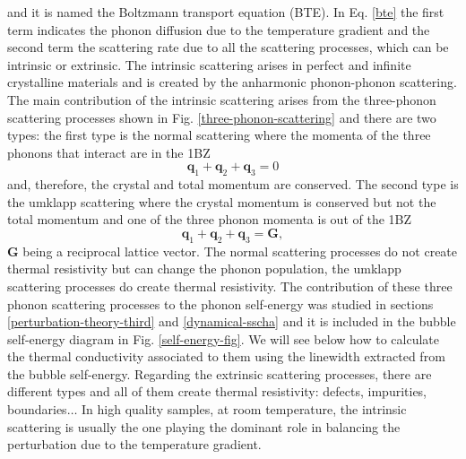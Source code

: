 and it is named the Boltzmann transport equation (BTE). In Eq. \ref{bte} the first term indicates the phonon diffusion due to the temperature gradient and the second term the scattering rate due to all the scattering 
processes, which can be intrinsic or extrinsic. The intrinsic scattering arises in perfect and infinite crystalline materials and is created by the anharmonic phonon-phonon scattering. The main contribution of 
the intrinsic scattering arises from the three-phonon scattering processes shown in Fig. \ref{three-phonon-scattering} and there are two types: the first type is the normal scattering where the momenta of the three 
phonons that interact are in the 1BZ
\begin{equation}
\mathbf{q}_{1}+\mathbf{q}_{2}+\mathbf{q}_{3}=0
\end{equation} 
and, therefore, the crystal and total momentum are conserved. The second type is the umklapp scattering where the crystal momentum is conserved but not the total momentum and one of the three phonon momenta is out of the 1BZ
\begin{equation}
\mathbf{q}_{1}+\mathbf{q}_{2}+\mathbf{q}_{3}=\mathbf{G},
\end{equation}
$\mathbf{G}$ being a reciprocal lattice vector. The normal scattering processes do not create thermal resistivity but can change the phonon population\cite{callaway1959model,tritt2005thermal}, the umklapp scattering 
processes do create thermal resistivity. The contribution of these three phonon scattering processes to the phonon self-energy was studied in sections \ref{perturbation-theory-third} and \ref{dynamical-sscha} and it is 
included in the bubble self-energy diagram in Fig. \ref{self-energy-fig}. We will see below how to calculate the thermal conductivity associated to them using the linewidth extracted from the bubble self-energy. Regarding the 
extrinsic scattering processes, there are different types and all of them create thermal resistivity: defects, impurities, boundaries$\dots$ In high quality samples, at room temperature, the intrinsic scattering is usually the 
one playing the dominant role in balancing the perturbation due to the temperature gradient. \\

